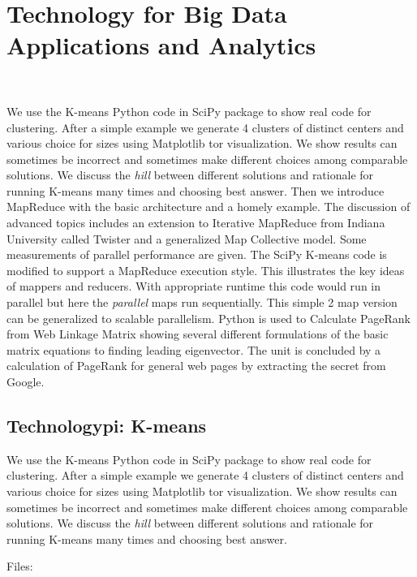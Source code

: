 


\chapter{Technology for Big Data Applications and
Analytics}\label{technology-for-big-data-applications-and-analytics}

\FILENAME\

We use the K-means Python code in SciPy package to show real code for
clustering. After a simple example we generate 4 clusters of distinct
centers and various choice for sizes using Matplotlib tor visualization.
We show results can sometimes be incorrect and sometimes make different
choices among comparable solutions. We discuss the \textit{hill} between
different solutions and rationale for running K-means many times and
choosing best answer. Then we introduce MapReduce with the basic
architecture and a homely example. The discussion of advanced topics
includes an extension to Iterative MapReduce from Indiana University
called Twister and a generalized Map Collective model. Some measurements
of parallel performance are given. The SciPy K-means code is modified to
support a MapReduce execution style. This illustrates the key ideas of
mappers and reducers. With appropriate runtime this code would run in
parallel but here the \emph{parallel} maps run sequentially. This simple
2 map version can be generalized to scalable parallelism. Python is used
to Calculate PageRank from Web Linkage Matrix showing several different
formulations of the basic matrix equations to finding leading
eigenvector. The unit is concluded by a calculation of PageRank for
general web pages by extracting the secret from Google.

\section{Technologypi: K-means}\label{technologypi-k-means}

We use the K-means Python code in SciPy package to show real code for
clustering. After a simple example we generate 4 clusters of distinct
centers and various choice for sizes using Matplotlib tor visualization.
We show results can sometimes be incorrect and sometimes make different
choices among comparable solutions. We discuss the \emph{hill} between
different solutions and rationale for running K-means many times and
choosing best answer.

Files:


